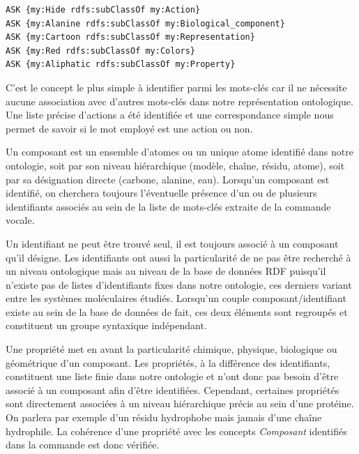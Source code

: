 \begin{lstlisting}[language=XML, caption=\textit{Requêtes SPARQL effectuées pour tester la nature des mots-clés entrés par l'utilisateur}, label=sparql_cmd]
ASK {my:Hide rdfs:subClassOf my:Action}
ASK {my:Alanine rdfs:subClassOf my:Biological_component}
ASK {my:Cartoon rdfs:subClassOf my:Representation}
ASK {my:Red rdfs:subClassOf my:Colors}
ASK {my:Aliphatic rdfs:subClassOf my:Property}
\end{lstlisting}


C'est le concept le plus simple à identifier parmi les mots-clés car il ne nécessite aucune association avec d'autres mots-clés dans notre représentation ontologique. Une liste précise d'actions a été identifiée et une correspondance simple nous permet de savoir si le mot employé est une action ou non.


Un composant est un ensemble d'atomes ou un unique atome identifié dans notre ontologie, soit par son niveau hiérarchique (modèle, chaîne, résidu, atome), soit par sa désignation directe (carbone, alanine, eau). Lorsqu'un composant est identifié, on cherchera toujours l'éventuelle présence d'un ou de plusieurs identifiants associés au sein de la liste de mots-clés extraite de la commande vocale.


Un identifiant ne peut être trouvé seul, il est toujours associé à un composant qu'il désigne. Les identifiants ont aussi la particularité de ne pas être recherché à un niveau ontologique mais au niveau de la base de données RDF puisqu'il n'existe pas de listes d'identifiants fixes dans notre ontologie, ces derniers variant entre les systèmes moléculaires étudiés. Lorsqu'un couple composant/identifiant existe au sein de la base de données de fait, ces deux éléments sont regroupés et constituent un groupe syntaxique indépendant.


Une propriété met en avant la particularité chimique, physique, biologique ou géométrique d'un composant. Les propriétés, à la différence des identifiants, constituent une liste finie dans notre ontologie et n'ont donc pas besoin d'être associé à un composant afin d'être identifiées. Cependant, certaines propriétés sont directement associées à un niveau hiérarchique précis au sein d'une protéine. On parlera par exemple d'un résidu hydrophobe mais jamais d'une chaîne hydrophile. La cohérence d'une propriété avec les concepts \textit{Composant} identifiés dans la commande est donc vérifiée. 

